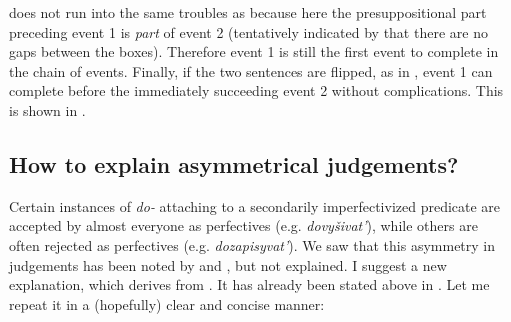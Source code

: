 \documentclass[output=paper,
colorlinks,
citecolor=brown,
newtxmath
]{langscibook}
\begin{document}
\ex\label{lineare}
\ex\label{linearf}
\z\z

\noindent {} does not run into the same troubles as  because
here the presuppositional part preceding event 1 is \textit{part} of event 2 (tentatively indicated by that there are no gaps between the boxes). Therefore event 1 is still the first event to complete in the chain of events. Finally, if the two sentences are flipped, as in , event 1 can complete before the immediately succeeding event 2 without complications. This is shown in .


\subsection{How to explain asymmetrical judgements?}
Certain instances of \textit{do-} attaching to a secondarily imperfectivized predicate are accepted by almost everyone as perfectives (e.g. \textit{dovyšivat'}), while others are often rejected as perfectives (e.g. \textit{dozapisyvat'}). We saw that this asymmetry in judgements has been noted by \citet{Zinova.Filip2015} and \citet{Zinova2016}, but not explained.
I suggest a new explanation, which derives from . It has already been stated above in . Let me repeat it in a (hopefully) clear and concise manner:
\end{document}

